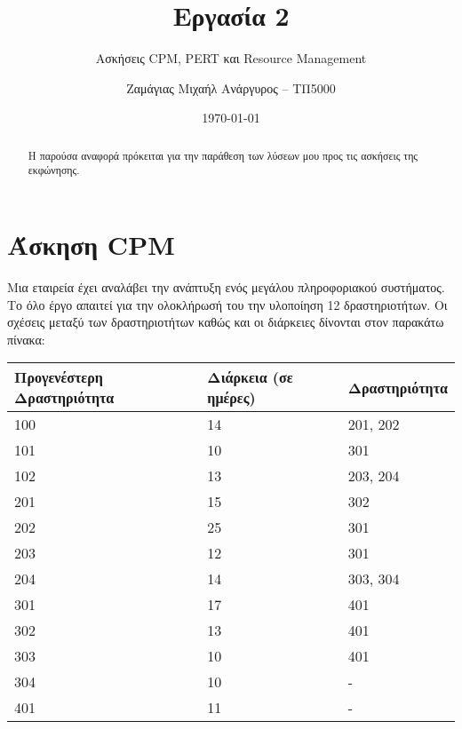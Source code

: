 \documentclass[12pt]{turabian-researchpaper}
\title{Εργασία 2}
\subtitle{Ασκήσεις CPM, PERT και Resource Management}
\author{Ζαμάγιας Μιχαήλ Ανάργυρος -- ΤΠ5000}
\date{\today}
\begin{document}
\begin{titlepage}
    \maketitle
\end{titlepage}

\begin{abstract}
    Η παρούσα αναφορά πρόκειται για την παράθεση των λύσεων μου προς τις ασκήσεις της εκφώνησης.
\end{abstract}

\tableofcontents

\newpage

\section{Άσκηση CPM}
Μια εταιρεία έχει αναλάβει την ανάπτυξη ενός μεγάλου πληροφοριακού συστήματος. Το όλο έργο απαιτεί για την ολοκλήρωσή του την υλοποίηση 12 δραστηριοτήτων. Οι σχέσεις μεταξύ των δραστηριοτήτων καθώς και οι διάρκειες δίνονται στον παρακάτω πίνακα:
\begin{table}
    \centering
    \begin{tabular}{lll}
        \hline
        Προγενέστερη Δραστηριότητα & Διάρκεια (σε ημέρες) & Δραστηριότητα \\ \hline
        100                        & 14                   & 201, 202      \\
        101                        & 10                   & 301           \\
        102                        & 13                   & 203, 204      \\
        201                        & 15                   & 302           \\
        202                        & 25                   & 301           \\
        203                        & 12                   & 301           \\
        204                        & 14                   & 303, 304      \\
        301                        & 17                   & 401           \\
        302                        & 13                   & 401           \\
        303                        & 10                   & 401           \\
        304                        & 10                   & -             \\
        401                        & 11                   & -             \\ \hline
    \end{tabular}
\end{table}
\end{document}
